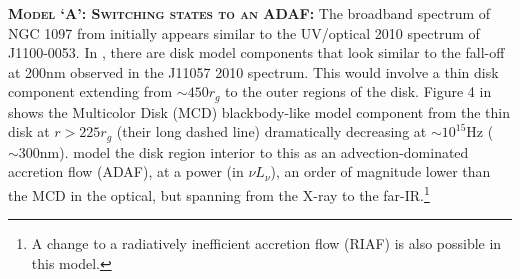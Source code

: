 \documentclass[11pt,a4paper]{article}
\begin{document}
\smallskip \smallskip
\noindent
\textbf{\textsc{Model `A': Switching states to an ADAF: }}
The broadband spectrum of NGC 1097 from \citet{Nemmen2006} initially appears similar to the UV/optical 2010 spectrum of J1100-0053.  In \citet[][e.g., their Figure 4]{Nemmen2006}, there are disk model components that look similar to the fall-off at 200nm observed in the J11057 2010 spectrum. This would involve a thin disk component extending from $\sim 450r_{g}$ to the outer regions of the disk. Figure 4 in \citet{Nemmen2006} shows the Multicolor Disk (MCD) blackbody-like model component from the thin disk at $r>225r_{g}$ (their long dashed line) dramatically decreasing at $\sim 10^{15}$Hz ($\sim 300$nm). \citet{Nemmen2006} model the disk region interior to this as an advection-dominated accretion flow (ADAF), at a power (in $\nu L_{\nu}$), an order of magnitude lower than the MCD in the optical, but spanning from the X-ray to the far-IR.\footnote{A change to  a radiatively inefficient accretion flow (RIAF) is also possible in this model.}
\end{document}

